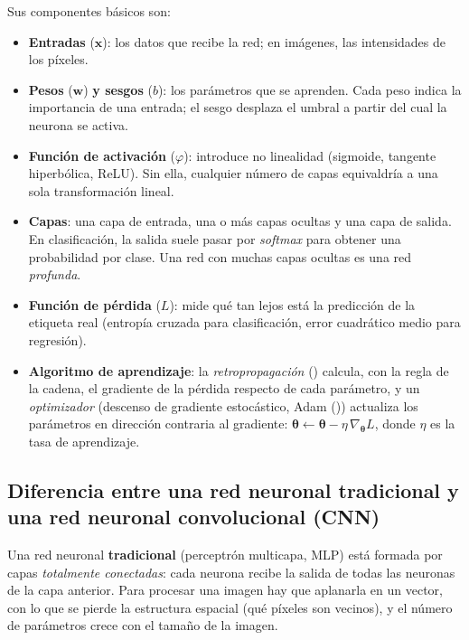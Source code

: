 \documentclass[11pt,letterpaper]{article}
\makeatletter
\newcommand{\cit@chk}[1]{\ifcsdef{citA@#1}{}{\PackageError{citas}{Cita no definida: #1}{}}}
\newcommand{\cit@item}[1]{\cit@chk{#1}\cit@sep\csuse{citA@#1}, \csuse{citY@#1}\gdef\cit@sep{; }}
\newcommand{\parencite}[1]{(\gdef\cit@sep{}\forcsvlist{\cit@item}{#1})}
\makeatother
\begin{document}
Sus componentes básicos son:
\begin{itemize}
  \item \textbf{Entradas} ($\mathbf{x}$): los datos que recibe la red; en imágenes, las intensidades de los píxeles.
  \item \textbf{Pesos} ($\mathbf{w}$) \textbf{y sesgos} ($b$): los parámetros que se aprenden. Cada peso indica la importancia de una entrada; el sesgo desplaza el umbral a partir del cual la neurona se activa.
  \item \textbf{Función de activación} ($\varphi$): introduce no linealidad (sigmoide, tangente hiperbólica, ReLU). Sin ella, cualquier número de capas equivaldría a una sola transformación lineal.
  \item \textbf{Capas}: una capa de entrada, una o más capas ocultas y una capa de salida. En clasificación, la salida suele pasar por \emph{softmax} para obtener una probabilidad por clase. Una red con muchas capas ocultas es una red \emph{profunda}.
  \item \textbf{Función de pérdida} ($L$): mide qué tan lejos está la predicción de la etiqueta real (entropía cruzada para clasificación, error cuadrático medio para regresión).
  \item \textbf{Algoritmo de aprendizaje}: la \emph{retropropagación} \parencite{rumelhart} calcula, con la regla de la cadena, el gradiente de la pérdida respecto de cada parámetro, y un \emph{optimizador} (descenso de gradiente estocástico, Adam \parencite{adam}) actualiza los parámetros en dirección contraria al gradiente: $\boldsymbol{\theta} \leftarrow \boldsymbol{\theta} - \eta\,\nabla_{\boldsymbol{\theta}}L$, donde $\eta$ es la tasa de aprendizaje.
\end{itemize}

\subsection{Diferencia entre una red neuronal tradicional y una red neuronal convolucional (CNN)}

Una red neuronal \textbf{tradicional} (perceptrón multicapa, MLP) está formada por capas \emph{totalmente conectadas}: cada neurona recibe la salida de todas las neuronas de la capa anterior. Para procesar una imagen hay que aplanarla en un vector, con lo que se pierde la estructura espacial (qué píxeles son vecinos), y el número de parámetros crece con el tamaño de la imagen.
\end{document}
